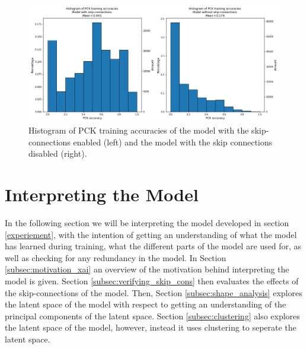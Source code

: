\documentclass[./main.tex]{subfiles}
\begin{document}
\begin{figure}[htbp]
    \centering
    \includegraphics[width = \textwidth]{entities/PCK_accs_vs.png}
    \caption{Histogram of PCK training accuracies of the model with the skip-connections enabled (left) and the model with the skip connections disabled (right).}
    \label{fig:PCK_accs}
\end{figure}

\section{Interpreting the Model}\label{sec:XAI}
In the following section we will be interpreting the model developed in section \ref{experiement}, with the intention of getting an understanding of what the model has learned during training, what the different parts of the model are used for, as well as checking for any redundancy in the model. In Section \ref{subsec:motivation_xai} an overview of the motivation behind interpreting the model is given. Section \ref{subsec:verifying_skip_cons} then evaluates the effects of the skip-connections of the model. Then, Section \ref{subsec:shape_analysis} explores the latent space of the model with respect to getting an understanding of the principal components of the latent space. Section \ref{subsec:clustering} also explores the latent space of the model, however, instead it uses clustering to seperate the latent space.
\end{document}
